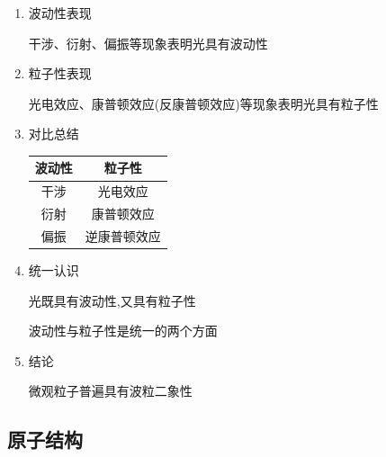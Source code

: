 \documentclass{article}
\begin{document}
\begin{enumerate}
    \item 波动性表现

          干涉、衍射、偏振等现象表明光具有波动性

    \item 粒子性表现

          光电效应、康普顿效应(反康普顿效应)等现象表明光具有粒子性

    \item 对比总结

          \begin{center}
              \renewcommand{\arraystretch}{1.5}
              \begin{tabular}{|c|c|}
                  \hline
                  \textbf{波动性} & \textbf{粒子性} \\
                  \hline
                  干涉           & 光电效应         \\
                  \hline
                  衍射           & 康普顿效应        \\
                  \hline
                  偏振           & 逆康普顿效应       \\
                  \hline
              \end{tabular}
          \end{center}

    \item 统一认识

          光既具有波动性,又具有粒子性

          波动性与粒子性是统一的两个方面

    \item 结论

          微观粒子普遍具有波粒二象性
\end{enumerate}

\newpage

\subsection{原子结构}
\end{document}
